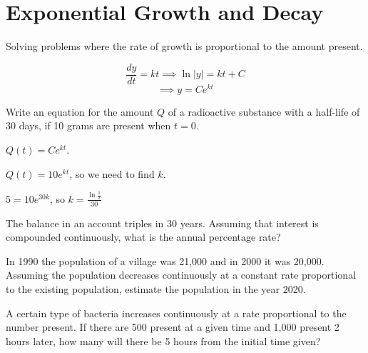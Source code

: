 \documentclass[../bccalc.tex]{subfiles}
\begin{document}
\pagebreak
\section{Exponential Growth and Decay}
Solving problems where the rate of growth is proportional to the amount present.

\[ \frac{dy}{dt}=kt \implies \ln|y|=kt +C\]
\[ \implies y=Ce^{kt}\]

\begin{example}
    Write an equation for the amount $Q$ of a radioactive substance with a half-life of 30 days, if 10 grams are present when $t=0$.

    $Q(t)=Ce^{kt}$.

    $Q(t)=10e^{kt}$, so we need to find $k$.

    $5=10e^{30k}$, so $k= \frac{\ln \frac{1}{2}}{30}$
\end{example}

\ex The balance in an account triples in 30 years. Assuming that interest is compounded continuously, what is the annual percentage rate?

\ex In 1990 the population of a village was 21,000 and in 2000 it was 20,000. Assuming the population decreases continuously at a constant rate proportional to the existing population, estimate the population in the year 2020.

\ex A certain type of bacteria increases continuously at a rate proportional to the number present. If there are 500 present at a given time and 1,000 present 2 hours later, how many will there be 5 hours from the initial time given?
\end{document}
